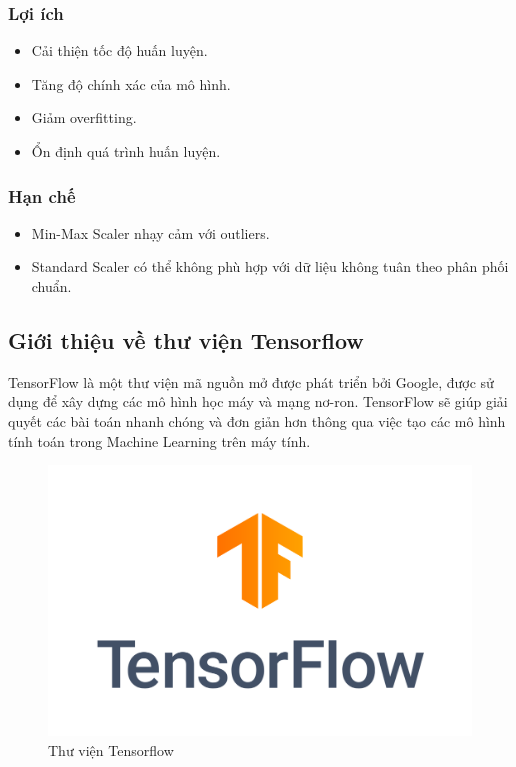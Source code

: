\subsubsection{Lợi ích}
\begin{itemize}
\item Cải thiện tốc độ huấn luyện.
\item Tăng độ chính xác của mô hình.
\item Giảm overfitting.
\item Ổn định quá trình huấn luyện.
\end{itemize}

\subsubsection{Hạn chế}
\begin{itemize}
\item Min-Max Scaler nhạy cảm với outliers.
\item Standard Scaler có thể không phù hợp với dữ liệu không tuân theo phân phối chuẩn.
\end{itemize}

\subsection{Giới thiệu về thư viện Tensorflow}
\indent TensorFlow là một thư viện mã nguồn mở được phát triển bởi Google, được sử dụng để xây dựng các mô hình học máy và mạng nơ-ron. TensorFlow sẽ giúp giải quyết các bài toán nhanh chóng và đơn giản hơn thông qua việc tạo các mô hình tính toán trong Machine Learning trên máy tính.
\begin{figure}[H]
    \centering
    \includegraphics[width=\textwidth,height=\textheight,keepaspectratio]{Images/Theoretical basis/TensorFlow_logo.png}
    \caption{Thư viện Tensorflow}
    \label{fig:enter-label}
\end{figure}
